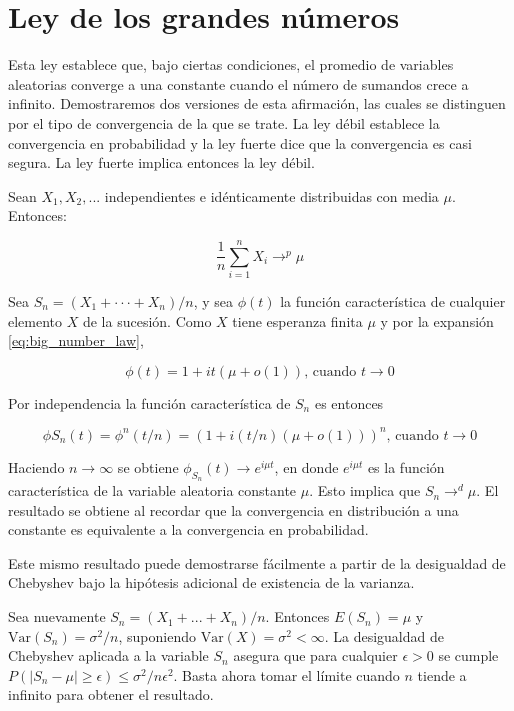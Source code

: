\section{Ley de los grandes números}

Esta ley establece que, bajo ciertas condiciones, el promedio de variables
aleatorias converge a una constante cuando el número de
sumandos crece a infinito. Demostraremos dos versiones de esta afirmación, las
cuales se distinguen por el tipo de convergencia de la que se trate. La ley
débil establece la convergencia en probabilidad y la ley fuerte dice que la
convergencia es casi segura. La ley fuerte implica entonces la ley débil.\\


\begin{tcolorbox}[colback=gray!5!white,colframe=gray!60!black,title=Teorema de Bernoulli: Ley débil de los grandes números]
Sean $X_1 , X_2 , ...$ independientes e idénticamente distribuidas con media $\mu$.
Entonces:

\begin{equation}
    \frac{1}{n} \sum_{i=1}^{n} X_i \rightarrow^p \mu
    \label{eq:big_number_law}
\end{equation}

\end{tcolorbox}


Sea $S_n = (X_1 + · · · + X_n )/n$, y sea $\phi (t)$ la función característica
de cualquier elemento $X$ de la sucesión. Como $X$ tiene esperanza
finita $\mu$ y por la expansión \eqref{eq:big_number_law},

\begin{equation}
    \phi (t) = 1 + it(\mu + o(1)) \text{, cuando } t \rightarrow 0
\end{equation}

Por independencia la función característica de $S_n$ es entonces

\begin{equation}
    \phi S_n(t) = \phi^n (t/n)= (1 + i(t/n)(\mu + o(1)))^n \text{, cuando } t \rightarrow 0
\end{equation}

Haciendo $n \rightarrow \infty$ se obtiene $\phi_{S_n} (t) \rightarrow e^{i \mu
t}$, en donde $e^{i \mu t}$ es la función característica de la variable
aleatoria constante $\mu$. Esto implica que $S_n \rightarrow^d \mu$. El
resultado se obtiene al recordar que la convergencia en distribución a una
constante es equivalente a la convergencia en probabilidad.

Este mismo resultado puede demostrarse fácilmente a partir de la desigualdad de
Chebyshev bajo la hipótesis adicional de existencia de la varianza.

Sea nuevamente $S_n = (X_1 + ... + X_n )/n$. Entonces $E(S_n ) = \mu$ y
$\text{Var}(S_n) = \sigma^2/n$, suponiendo $\text{Var}(X) = \sigma^2 < \infty$.
La desigualdad de Chebyshev aplicada a la variable $S_n$ asegura que para
cualquier $\epsilon > 0$ se cumple $P (|S_n - \mu| \geq \epsilon) \leq \sigma^2
/n \epsilon^2$. Basta ahora tomar el límite cuando $n$ tiende a infinito para
obtener el resultado.